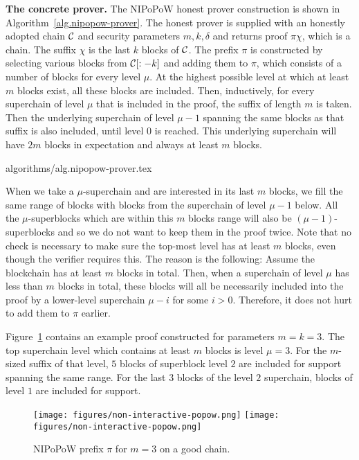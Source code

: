\noindent
\textbf{The concrete prover.}
The NIPoPoW honest prover construction is shown in
Algorithm~\ref{alg.nipopow-prover}. The honest prover is supplied with an
honestly adopted chain $\mathcal{C}$ and security parameters $m, k, \delta$ and
returns proof $\pi\chi$, which is a chain. The suffix $\chi$ is the last $k$
blocks of $\mathcal{C}$. The prefix $\pi$ is constructed by selecting various blocks
from $\mathcal{C}[:-k]$ and adding them to $\pi$, which consists of a number of
blocks for every level $\mu$. At the highest possible level at which at least
$m$ blocks exist, all these blocks are included. Then, inductively, for every
superchain of level $\mu$ that is included in the proof, the suffix of length
$m$ is taken. Then the underlying superchain of level $\mu - 1$ spanning the
same blocks as that suffix is also included, until level $0$ is reached. This
underlying superchain will have $2m$ blocks in expectation and always at least
$m$ blocks.

{algorithms/alg.nipopow-prover.tex}

When we take a $\mu$-superchain and are interested in its last $m$ blocks, we
fill the same range of blocks with blocks from the superchain of level $\mu - 1$
below. All the $\mu$-superblocks which are within this $m$ blocks range
will also be $(\mu-1)$-superblocks and so we do not want to keep them
in the proof twice. Note that no check is necessary to
make sure the top-most level has at least $m$ blocks, even though the verifier
requires this. The reason is the following: Assume the blockchain has at least
$m$ blocks in total. Then, when a superchain of level $\mu$ has less than $m$
blocks in total, these blocks will all be necessarily included into the proof by
a lower-level superchain $\mu - i$ for some $i > 0$. Therefore, it does not hurt
to add them to $\pi$ earlier.

Figure~\ref{fig.nipopow} contains an example proof constructed for parameters
$m = k = 3$. The top superchain level which contains at least $m$ blocks is
level $\mu = 3$. For the $m$-sized suffix of that level, $5$ blocks of
superblock level $2$ are included for support spanning the same range. For the
last $3$ blocks of the level $2$ superchain, blocks of level $1$ are included
for support.

\begin{figure}[h]
    \caption{
    NIPoPoW prefix $\pi$ for $m = 3$ on a good chain.
    }
    \centering
    \iftwocolumn
        \texttt{[image: figures/non-interactive-popow.png]}
    \else
        \texttt{[image: figures/non-interactive-popow.png]}
    \fi
    \label{fig.nipopow}
\end{figure}

